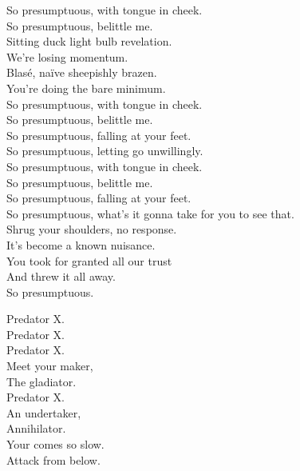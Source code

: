 So presumptuous, with tongue in cheek. \\
So presumptuous, belittle me. \\

Sitting duck light bulb revelation. \\
We're losing momentum. \\
Blasé, naïve sheepishly brazen. \\
You're doing the bare minimum. \\

So presumptuous, with tongue in cheek. \\
So presumptuous, belittle me. \\
So presumptuous, falling at your feet. \\
So presumptuous, letting go unwillingly. \\

So presumptuous, with tongue in cheek. \\
So presumptuous, belittle me. \\
So presumptuous, falling at your feet. \\
So presumptuous, what's it gonna take for you to see that. \\

Shrug your shoulders, no response. \\
It's become a known nuisance. \\
You took for granted all our trust \\
And threw it all away. \\
So presumptuous. \\





Predator X. \\
Predator X. \\
Predator X. \\
Meet your maker, \\
The gladiator. \\
Predator X. \\
An undertaker, \\
Annihilator. \\

Your  comes so slow. \\
Attack from below. \\

